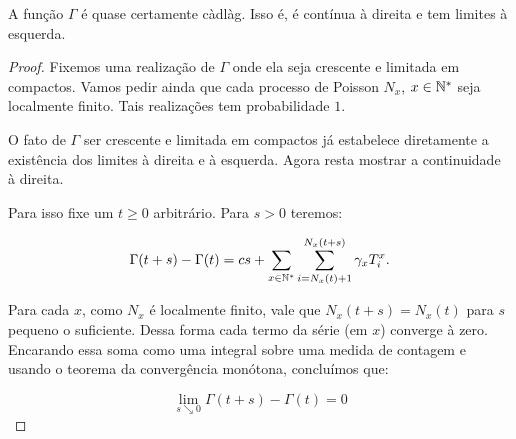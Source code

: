 \begin{proposicao}
  \label{prop:gamma-cadlag}
  A função $\Gamma$ é quase certamente càdlàg. Isso é, é contínua à
  direita e tem limites à esquerda.
\end{proposicao}
\begin{proof}

  Fixemos uma realização de $\Gamma$ onde ela seja crescente e
  limitada em compactos. Vamos pedir ainda que cada processo de
  Poisson $N_x$, $x \in {\mathbb{N^*}}$ seja localmente finito. Tais realizações
  tem probabilidade $1$.

  O fato de $\Gamma$ ser crescente e limitada em compactos já
  estabelece diretamente a existência dos limites à direita e à
  esquerda. Agora resta mostrar a continuidade à direita.

  Para isso fixe um $t \geq 0$ arbitrário. Para $s > 0$ teremos:

  \begin{equation*}
    \Gamma(t+s) - \Gamma(t) = 
    c s + 
    \sum_{x \in {\mathbb{N^*}}} \sum_{i = N_x(t)+1}^{N_x(t+s)} \gamma_x T^x_i.
  \end{equation*}

  Para cada $x$, como $N_x$ é localmente finito, vale que $N_x(t+s) =
  N_x(t)$ para $s$ pequeno o suficiente. Dessa forma cada termo da
  série (em $x$) converge à zero. Encarando essa soma como uma
  integral sobre uma medida de contagem e usando o teorema da
  convergência monótona, concluímos que:

  \begin{displaymath}
    \lim_{s \searrow 0} \Gamma(t+s) - \Gamma(t) = 0
  \end{displaymath}
\end{proof}

